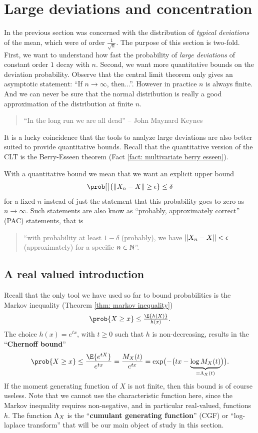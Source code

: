 \section{Large deviations and concentration}
\label{sec: concentration inequalities}

In the previous section was concerned with the distribution of \emph{typical deviations} of
the mean, which were of order \(\frac1{\sqrt{n}}\). The purpose of this section is two-fold. First, we want to understand
how fast the probability of \emph{large deviations} of constant order \(1\) decay with \(n\).
Second, we want more quantitative bounds on the deviation probability.
Observe that the central limit theorem only gives an asymptotic statement:
``If \(n\to\infty\), then...''. However in practice \(n\) is always finite.
And we can never be sure that the normal distribution is really a good
approximation of the distribution at finite \(n\).
\begin{quotation}
    ``In the long run we are all dead'' -- John Maynard Keynes 
\end{quotation}
It is a lucky coincidence that the tools to analyze large deviations are also
better suited to provide quantitative bounds. Recall that the quantitative
version of the CLT is the Berry-Esseen theorem (Fact \ref{fact: multivariate berry esseen}).

With a quantitative bound we mean that we want an explicit upper bound
\[
    \prob[\big]{\norm{X_n - X} \ge \epsilon} \le \delta
\]
for a fixed \(n\) instead of just the statement that this probability goes to zero as
\(n\to\infty\). Such statements are also know as ``probably, approximately
correct'' (PAC) statements, that is
\begin{quote}
``with probability at least \(1-\delta\) (probably), we have \(\lVert X_n - X\rVert <
\epsilon\) (approximately) for a specific \(n\in \mathbb{N}\)''.
\end{quote}

\subsection{A real valued introduction}

Recall that the only tool we have used so far to bound probabilities is the
Markov inequality (Theorem \ref{thm: markov inequality})
\[
    \prob{X \ge x} \le \tfrac{\E{h(X)}}{h(x)}.
\]
The choice \(h(x) = e^{tx}\), with \(t\ge 0\) such that \(h\) is
non-decreasing, results in the ``\textbf{Chernoff bound}''
\[
    \prob{X \ge x}
    \le \frac{\E{e^{t  X}}}{e^{t x}}
    = \frac{\MGF_X(t)}{e^{t x}}
    = \exp\bigl(-\bigl(t x - \underbrace{\log \MGF_X(t)}_{=\CGF_X(t)}\bigr)\bigr).
\]
If the moment generating function of \(X\) is not finite, then this bound is
of course useless. Note that we cannot use the characteristic function here,
since the Markov inequality requires non-negative, and in particular
real-valued, functions \(h\). The function \(\Lambda_X\) is the ``\textbf{cumulant
generating function}'' (CGF) or ``log-laplace transform'' that will be our main object
of study in this section.

